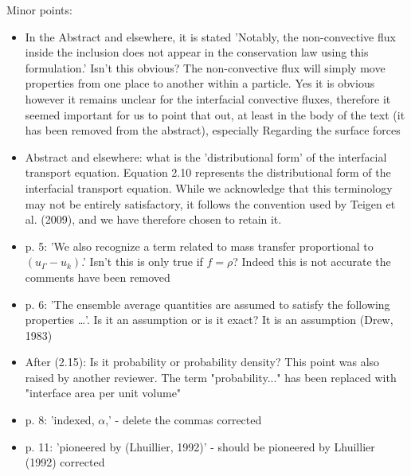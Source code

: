 \documentclass[10pt,a4paper]{article}
\newcommand{\tb}[1]{\color{blue}#1\color{black}}
\begin{document}
Minor points: 
\begin{itemize}
    \item In the Abstract and elsewhere, it is stated 'Notably, the non-convective flux inside the inclusion does not appear in the conservation law using this formulation.' Isn't this obvious?
    The non-convective flux will simply move properties from one place to another within a particle.
    \tb{Yes it is obvious however it remains unclear for the interfacial convective fluxes, therefore it seemed important for us to point that out, at least in the body of the text (it has been removed from the abstract),  especially Regarding the surface forces}
    \item Abstract and elsewhere: what is the 'distributional form' of the interfacial transport equation.
    \tb{Equation 2.10 represents the distributional form of the interfacial transport equation. While we acknowledge that this terminology may not be entirely satisfactory, it follows the convention used by Teigen et al. (2009), and we have therefore chosen to retain it.} %
    \item p. 5: 'We also recognize a term related to mass transfer proportional to $(u_\Gamma - u_k)$.' Isn't this is only true if $f = \rho$?
    \tb{Indeed this is not accurate the comments have been removed}
    \item p. 6: 'The ensemble average quantities are assumed to satisfy the following properties …'. Is it an assumption or is it exact?
    \tb{It is an assumption (Drew, 1983)}
    \item After (2.15): Is it probability or probability density?
    \tb{This point was also raised by another reviewer. 
    The term "probability..." has been replaced with "interface area per unit volume"}
    \item  p. 8: 'indexed, $\alpha$,' - delete the commas
    \tb{corrected}
    \item  p. 11: 'pioneered by (Lhuillier, 1992)' - should be pioneered by Lhuillier (1992)
    \tb{corrected}
\end{itemize}
\end{document}

